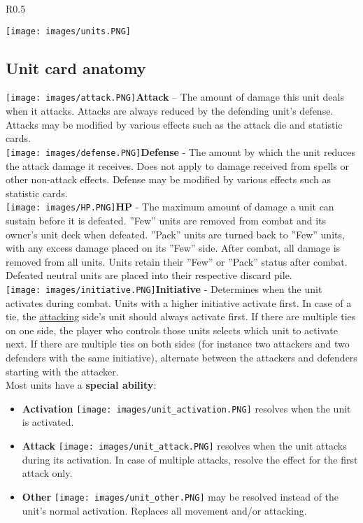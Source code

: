 \documentclass[12pt]{article}
\begin{document}
\clearpage
\begin{wrapfigure}{R}{0.5\textwidth}
    \begin{center}
    \texttt{[image: images/units.PNG]}
    \end{center}
\end{wrapfigure}
\subsection*{Unit card anatomy}
\texttt{[image: images/attack.PNG]}\textbf{Attack} – The amount of damage this unit deals when it attacks. Attacks are always reduced by the defending unit’s defense. Attacks may be modified by various effects such as the attack die and statistic cards.\\[6pt]
\texttt{[image: images/defense.PNG]}\textbf{Defense} - The amount by which the unit reduces the attack damage it receives. Does not apply to damage received from spells or other non-attack effects. Defense may be modified by various effects such as statistic cards.\\[6pt]
\texttt{[image: images/HP.PNG]}\textbf{\hypertarget{HP}{HP}} - The maximum amount of damage a unit can sustain before it is defeated. ”Few” units are removed from combat and its owner’s unit deck when defeated. ”Pack” units are turned back to ”Few” units, with any excess damage placed on its ”Few” side. After combat, all damage is removed from all units. Units retain their ”Few” or ”Pack” status after combat. Defeated neutral units are placed into their respective discard pile.\\[6pt]
\texttt{[image: images/initiative.PNG]}{\hypertarget{Initiative}{\textbf{Initiative}}} - Determines when the unit activates during combat. Units with a higher initiative activate first. In case of a tie, the \hyperlink{Combatterminology}{attacking} side’s unit should always activate first. If there are multiple ties on one side, the player who controls those units selects which unit to activate next. If there are multiple ties on both sides (for instance two attackers and two defenders with the same initiative), alternate between the attackers and defenders starting with the attacker.\\[6pt]
Most units have a \textbf{special ability}:\\[6pt]
  \begin{minipage}{.6\textwidth}
    \begin{itemize}[wide]
      \item\textbf{Activation} \texttt{[image: images/unit\_activation.PNG]} resolves when the unit is activated.
      \item\textbf{Attack} \texttt{[image: images/unit\_attack.PNG]} resolves when the unit attacks during its activation. In case of multiple attacks, resolve the effect for the first attack only.
      \item\textbf{Other} \texttt{[image: images/unit\_other.PNG]} may be resolved instead of the unit's normal activation. Replaces all movement and/or attacking.
    \end{itemize}
  \end{minipage}
\end{document}
